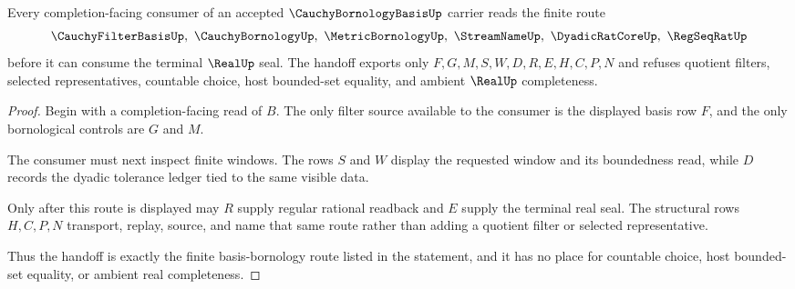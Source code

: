 \begin{theorem}
\label{thm:cauchy-bornology-basis-filter-handoff}
Every completion-facing consumer of an accepted $\CauchyBornologyBasisUp$ carrier reads the finite route
$$
\CauchyFilterBasisUp,\ \CauchyBornologyUp,\ \MetricBornologyUp,\ \StreamNameUp,\ \DyadicRatCoreUp,\ \RegSeqRatUp
$$
before it can consume the terminal $\RealUp$ seal. The handoff exports only $F,G,M,S,W,D,R,E,H,C,P,N$ and refuses quotient filters, selected representatives, countable choice, host bounded-set equality, and ambient $\RealUp$ completeness.
\end{theorem}
\begin{proof}
Begin with a completion-facing read of $B$. The only filter source available to the consumer is the displayed basis row $F$, and the only bornological controls are $G$ and $M$.

The consumer must next inspect finite windows. The rows $S$ and $W$ display the requested window and its boundedness read, while $D$ records the dyadic tolerance ledger tied to the same visible data.

Only after this route is displayed may $R$ supply regular rational readback and $E$ supply the terminal real seal. The structural rows $H,C,P,N$ transport, replay, source, and name that same route rather than adding a quotient filter or selected representative.

Thus the handoff is exactly the finite basis-bornology route listed in the statement, and it has no place for countable choice, host bounded-set equality, or ambient real completeness.
\end{proof}

